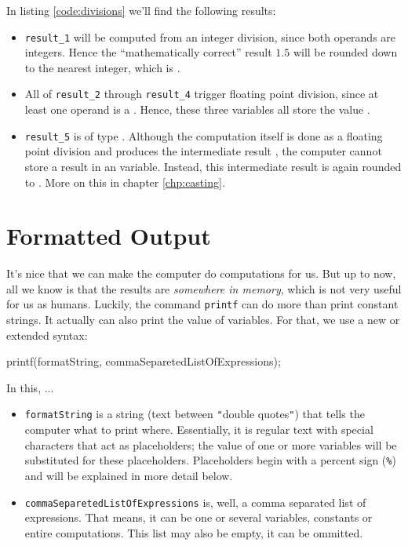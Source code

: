 In listing \ref{code:divisions} we'll find the following results:\vspace{-9pt}
\begin{itemize}
\setlength\itemsep{-6pt}
\item \texttt{result\_1} will be computed from an integer division, since both operands are integers. Hence the \enquote{mathematically correct} result $1.5$ will be rounded down to 
	the nearest integer, which is .
\item All of \texttt{result\_2} through \texttt{result\_4} trigger floating point division, since at least one operand is a . Hence, these three variables all store the 
	value .
\item \texttt{result\_5} is of type . Although the computation itself is done as a floating point division and produces the intermediate result , the computer cannot 
	store a  result in an  variable. Instead, this intermediate result is again rounded to . More on this in chapter \ref{chp:casting}.
\end{itemize}


\section{Formatted Output}
It's nice that we can make the computer do computations for us. But up to now, all we know is that the results are \emph{somewhere in memory}, which is not very useful for us as humans. Luckily, the command \texttt{printf} can do more than print constant strings. It actually can also print the value of variables. For that, we use a new or extended syntax:

\begin{codebox}
printf(formatString, commaSeparetedListOfExpressions);
\end{codebox}

In this, ...\vspace{-12pt}
\begin{itemize}
\setlength\itemsep{0pt}
\item \texttt{formatString} is a string (\ie text between \texttt{"}double quotes\texttt{"}) that tells the computer what to print where. Essentially, it is regular text with special
	characters that act as placeholders; the value of one or more variables will be substituted for these placeholders. Placeholders begin with a percent sign (\texttt{\%}) and will be
	explained in more detail below.
\item \texttt{commaSeparetedListOfExpressions} is, well, a comma separated list of expressions. That means, it can be one or several variables, constants or entire computations. This list 
	may also be empty, \ie it can be ommitted.
\end{itemize}

